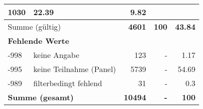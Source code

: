 \begin{longtable}{lXrrr}
       \num{1030} &
       \num[round-mode=places,round-precision=2]{22.39} &
         \num[round-mode=places,round-precision=2]{9.82} \\
     \midrule
     \multicolumn{2}{l}{Summe (gültig)} &
       \textbf{\num{4601}} &
     \textbf{\num{100}} &
       \textbf{\num[round-mode=places,round-precision=2]{43.84}} \\
     \multicolumn{5}{l}{\textbf{Fehlende Werte}}\\
       -998 &
       keine Angabe &
         \num{123} &
        - &
         \num[round-mode=places,round-precision=2]{1.17} \\
       -995 &
       keine Teilnahme (Panel) &
         \num{5739} &
        - &
         \num[round-mode=places,round-precision=2]{54.69} \\
       -989 &
       filterbedingt fehlend &
         \num{31} &
        - &
         \num[round-mode=places,round-precision=2]{0.3} \\
     \midrule
     \multicolumn{2}{l}{\textbf{Summe (gesamt)}} &
          \textbf{\num{10494}} &
        \textbf{-} &
        \textbf{\num{100}} \\
     \bottomrule
     \end{longtable}
     

